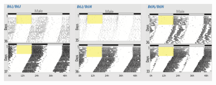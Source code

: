     \begin{figure}
        \includegraphics[width = \textwidth]{images/actogram_figure.pdf}


    


\end{figure}
